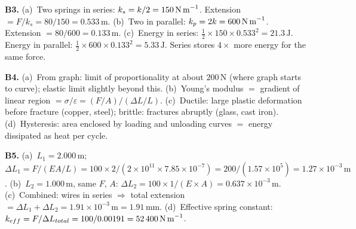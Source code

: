 \textbf{B3.}
(a)~Two springs in series: $k_s=k/2=150\,\text{N\,m}^{-1}$.
Extension $=F/k_s=80/150=0.533\,\text{m}$. \quad
(b)~Two in parallel: $k_p=2k=600\,\text{N\,m}^{-1}$.
Extension $=80/600=0.133\,\text{m}$. \quad
(c)~Energy in series: $\tfrac{1}{2}\times150\times0.533^2
=21.3\,\text{J}$. Energy in parallel:
$\tfrac{1}{2}\times600\times0.133^2=5.33\,\text{J}$.
Series stores $4\times$ more energy for the same force.

\textbf{B4.}
(a)~From graph: limit of proportionality at about
$200\,\text{N}$ (where graph starts to curve);
elastic limit slightly beyond this. \quad
(b)~Young's modulus $=$ gradient of linear region
$=\sigma/\varepsilon = (F/A)/(\Delta L/L)$. \quad
(c)~Ductile: large plastic deformation before fracture
(copper, steel); brittle: fractures abruptly (glass,
cast iron). \quad
(d)~Hysteresis: area enclosed by loading and unloading
curves $=$ energy dissipated as heat per cycle.

\textbf{B5.}
(a)~$L_1=2.000\,\text{m}$; $\Delta L_1=F/(EA/L)
=100\times2/(2\times10^{11}\times7.85\times10^{-7})
=200/(1.57\times10^5)=1.27\times10^{-3}\,\text{m}$.
\quad
(b)~$L_2=1.000\,\text{m}$, same $F$, $A$:
$\Delta L_2=100\times1/(E\times A)
=0.637\times10^{-3}\,\text{m}$.
\quad
(c)~Combined: wires in series $\Rightarrow$
total extension $=\Delta L_1+\Delta L_2
=1.91\times10^{-3}\,\text{m}=1.91\,\text{mm}$. \quad
(d)~Effective spring constant:
$k_{eff}=F/\Delta L_{total}=100/0.00191
=52\,400\,\text{N\,m}^{-1}$.

\endgroup


